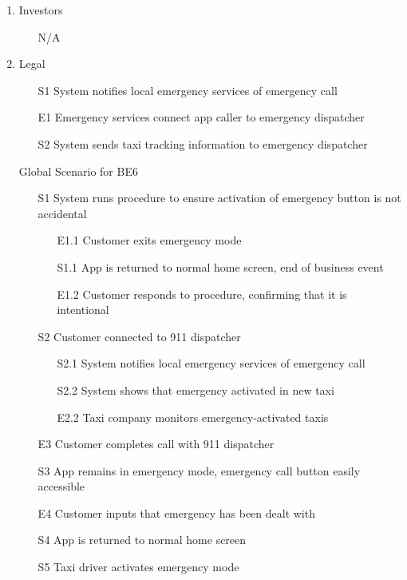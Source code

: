 \documentclass[]{article}
\begin{document}
\begin{enumerate}[{BE}1.]
\begin{enumerate}[{VP6}.1]
\begin{enumerate}
			\end{enumerate}
		\item Investors
			\begin{enumerate}
				\item[N/A]
			\end{enumerate}
		\item Legal
			\begin{enumerate}
				\item[S1] System notifies local emergency services of emergency call
				\item[E1] Emergency services connect app caller to emergency dispatcher
				\item[S2] System sends taxi tracking information to emergency dispatcher

			\end{enumerate}
		\item[Global] Scenario for BE6
			\begin{enumerate}
				\item[S1] System runs procedure to ensure activation of emergency button is not accidental
				\begin{enumerate}
					\item[E1.1] Customer exits emergency mode
					\item[S1.1] App is returned to normal home screen, end of business event
					\item[E1.2] Customer responds to procedure, confirming that it is intentional
				\end{enumerate}
				\item[S2] Customer connected to 911 dispatcher
				\begin{enumerate}
					\item[S2.1] System notifies local emergency services of emergency call
					\item[S2.2] System shows that emergency activated in new taxi
					\item[E2.2] Taxi company monitors emergency-activated taxis
				\end{enumerate}
				\item[E3] Customer completes call with 911 dispatcher
				\item[S3] App remains in emergency mode, emergency call button easily accessible
				\item[E4] Customer inputs that emergency has been dealt with
				\item[S4] App is returned to normal home screen
				\item[S5] Taxi driver activates emergency mode

\end{enumerate}
\end{enumerate}
\end{enumerate}
\end{document}
